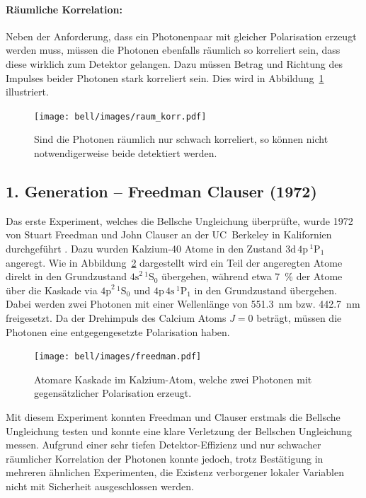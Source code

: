 \begin{refsection}
\paragraph{R\"aumliche Korrelation:}
Neben der Anforderung, dass ein Photonenpaar mit gleicher Polarisation erzeugt
werden muss, m\"ussen die Photonen ebenfalls r\"aumlich so korreliert sein,
dass diese wirklich zum Detektor gelangen.
Dazu m\"ussen Betrag und Richtung des Impulses beider Photonen stark korreliert
sein. Dies wird in Abbildung~\ref{fig:bell:raum_korr} illustriert.

\begin{figure}
    \centering
    \texttt{[image: bell/images/raum\_korr.pdf]}
    \caption{Sind die Photonen r\"aumlich nur schwach korreliert,
    so k\"onnen nicht notwendigerweise beide detektiert werden.}
    \label{fig:bell:raum_korr}
\end{figure}

\subsection{1. Generation -- Freedman Clauser (1972)}
Das erste Experiment, welches die Bellsche Ungleichung \"uberpr\"ufte,
wurde 1972 von Stuart Freedman und John Clauser an der UC~Berkeley
in Kalifornien durchgef\"uhrt \cite{Bell:Freedman1972}.
Dazu wurden Kalzium-40 Atome in den Zustand $\text{3d}\,\text{4p}\,^1\text{P}_1$
angeregt. 
Wie in Abbildung~\ref{fig:bell:freedman} dargestellt wird ein Teil der
angeregten Atome direkt in den Grundzustand $\text{4s}^2\,^1\text{S}_0$
\"ubergehen, w\"ahrend etwa \SI{7}{\percent} der Atome \"uber die Kaskade
via $\text{4p}^2\,^1\text{S}_0$ und $\text{4p}\,\text{4s}\,^1\text{P}_1$ 
in den Grundzustand \"ubergehen.
Dabei werden zwei Photonen mit einer Wellenl\"ange von \SI{551.3}{\nano\meter}
bzw. \SI{442.7}{\nano\meter} freigesetzt. 
Da der Drehimpuls des Calcium Atoms $J=0$ betr\"agt, m\"ussen die Photonen
eine entgegengesetzte Polarisation haben.

\begin{figure}
    \centering
    \texttt{[image: bell/images/freedman.pdf]}
    \caption{Atomare Kaskade im Kalzium-Atom, welche zwei Photonen mit
    gegens\"atzlicher Polarisation erzeugt. \cite{Bell:Freedman1972}}
    \label{fig:bell:freedman}
\end{figure}

Mit diesem Experiment konnten Freedman und Clauser erstmals die Bellsche
Ungleichung testen und konnte eine klare Verletzung der Bellschen Ungleichung
messen.
Aufgrund einer sehr tiefen Detektor-Effizienz und nur schwacher r\"aumlicher
Korrelation der Photonen konnte jedoch, trotz Best\"atigung in mehreren 
\"ahnlichen Experimenten, die Existenz verborgener lokaler Variablen nicht
mit Sicherheit ausgeschlossen werden.


\end{refsection}
